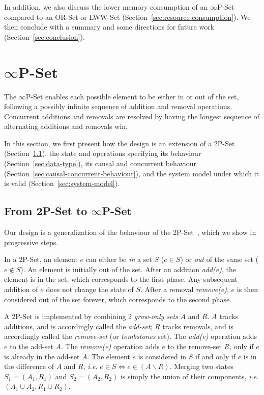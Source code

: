 \documentclass[10pt, oneside]{article}   	%
\begin{document}
In addition, we also discuss the lower memory consumption of an $\infty$P-Set compared to an OR-Set or LWW-Set (Section~\ref{sec:resource-consumption}). We then conclude with a summary and some directions for future work (Section~\ref{sec:conclusion}).

\section{$\infty$P-Set}
\label{sec:specification}

The $\infty$P-Set enables each possible element to be either in or out of the set, following a possibly infinite sequence of addition and removal operations. Concurrent additions and removals are resolved by having the longest sequence of alternating additions and removals win. 

In this section, we first present how the design is an extension of a 2P-Set (Section~\ref{sec:intuition}), the state and operations specifying its behaviour (Section~\ref{sec:data-type}), its causal and concurrent behaviour (Section~\ref{sec:causal-concurrent-behaviour}), and the system model under which it is valid (Section~\ref{sec:system-model}).

\subsection{From 2P-Set to $\infty$P-Set}
\label{sec:intuition}

Our design is a generalization of the behaviour of the 2P-Set~\cite{shapiro:inria-00555588}, which we show in progressive steps. 

In a 2P-Set, an element $e$ can either be \textit{in} a set $S$ ($e \in S$) or \textit{out} of the same set ($e \notin S$). An element is initially out of the set. After an addition \textit{add(e)}, the element is in the set, which corresponds to the first phase. Any subsequent addition of $e$ does not change the state of $S$. After a removal \textit{remove(e)}, $e$ is then considered out of the set forever, which corresponds to the second phase.

A 2P-Set is implemented by combining 2 \textit{grow-only sets} $A$ and $R$. $A$ tracks additions, and is accordingly called the \textit{add-set}; $R$ tracks removals, and is accordingly called the \textit{remove-set} (or \textit{tombstones} set). The \textit{add(e)} operation adds $e$ to the add-set $A$. The \textit{remove(e)} operation adds $e$ to the remove-set $R$, only if $e$ is already in the add-set $A$. The element $e$ is considered in $S$ if and only if $e$ is in the difference of $A$ and $R$, \textit{i.e.} $e \in S \Leftrightarrow e \in (A\backslash R)$. Merging two states $S_1 = (A_1, R_1)$ and $S_2 = (A_2, R_2)$ is simply the union of their components, \textit{i.e.} $(A_1 \cup A_2, R_1 \cup R_2)$.
\end{document}
